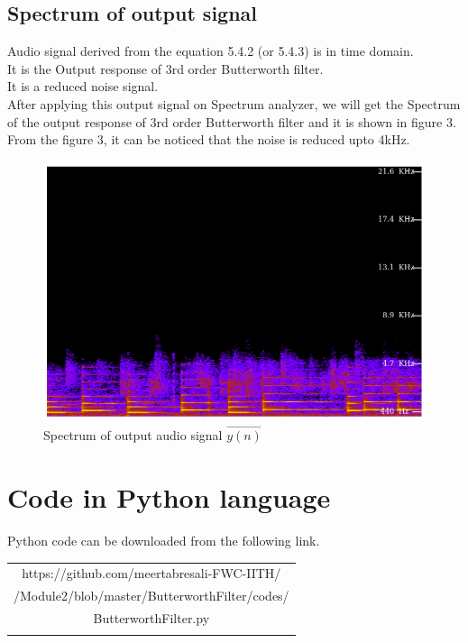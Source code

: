\documentclass[journal,10pt,twocolumn]{article}
\begin{document}
\begin{flushleft}
\section{Spectrum of output signal}
\vspace{0.5cm}
Audio signal derived from the equation 5.4.2 (or 5.4.3) is in time domain.\\
It is the Output response of 3rd order Butterworth filter.\\
It is a reduced noise signal.\\
\vspace{0.2cm}
After applying this output signal on Spectrum analyzer, we will get the Spectrum of the output response of 3rd order Butterworth filter and it is shown in figure 3.\\
\vspace{0.2cm}
From the figure 3, it can be noticed that the noise is reduced upto 4kHz.\\
\end{flushleft}

\begin{figure}[h]

\includegraphics[width=1\columnwidth]{filtered.png}
\caption{Spectrum of output audio signal $\vec{y(n)}$}
\label{fig:Spectrum of output audio signal}
\end{figure}

\section{Code in Python language}
\centering
Python code can be downloaded from the following link.
\begin{table}[h]
\centering
\begin{tabular}{|c|} \hline
\rule{0pt}{10pt} 
https://github.com/meertabresali-FWC-IITH/\\
/Module2/blob/master/ButterworthFilter/codes/\\
ButterworthFilter.py\\
\\\hline
 \end{tabular}
\end{table}
\end{document}
